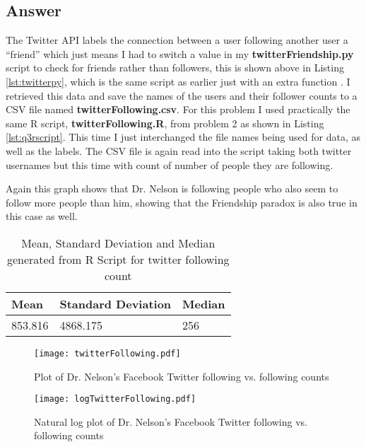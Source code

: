 \documentclass[letterpaper,11pt]{article}
\newcommand*{\srcPath}{../src}%
\begin{document}
\clearpage
\subsection*{Answer}

The Twitter API labels the connection between a user following another user a ``friend'' which just means I had to switch a value in my \textbf{twitterFriendship.py} script to check for friends rather than followers, this is shown above in Listing \ref{lst:twitterpy}, which is the same script as earlier just with an extra function \cite{twitterapi}. I retrieved this data and save the names of the users and their follower counts to a CSV file named \textbf{twitterFollowing.csv}. For this problem I used practically the same R script, \textbf{twitterFollowing.R}, from problem 2 as shown in Listing \ref{lst:q3rscript}. This time I just interchanged the file names being used for data, as well as the labels. The CSV file is again read into the script taking both twitter usernames but this time with count of number of people they are following.

Again this graph shows that Dr. Nelson is following people who also seem to follow more people than him, showing that the Friendship paradox is also true in this case as well.

\begin{table}[htb]
\centering
\begin{tabular}{ | l | l | l |}
\hline
\textbf{Mean} & \textbf{Standard Deviation} & \textbf{Median} \\
\hline
853.816 & 4868.175 & 256 \\
\hline
\end{tabular}
\caption{Mean, Standard Deviation and Median generated from R Script for twitter following count}
\label{table:summaryExtra}
\end{table}



\begin{figure}[h]
\centering
\texttt{[image: twitterFollowing.pdf]}
\caption{Plot of Dr. Nelson's Facebook Twitter following vs. following counts}
\label{fig:q2followers}
\end{figure}

\begin{figure}[h]
\centering
\texttt{[image: logTwitterFollowing.pdf]}
\caption{Natural log plot of Dr. Nelson's Facebook Twitter following vs. following counts}
\label{fig:q2logfollowers}
\end{figure}
\clearpage
\end{document}
